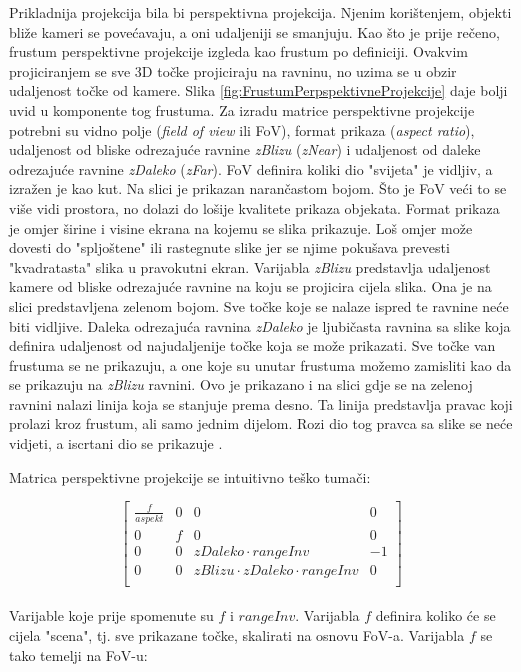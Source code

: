 \documentclass{foi}
\begin{document}
Prikladnija projekcija bila bi perspektivna projekcija. Njenim korištenjem, objekti bliže kameri se povećavaju, a oni udaljeniji se smanjuju. Kao što je prije rečeno, frustum perspektivne projekcije izgleda kao frustum po definiciji. Ovakvim projiciranjem se sve 3D točke projiciraju na ravninu, no uzima se u obzir udaljenost točke od kamere. Slika \ref{fig:FrustumPerpspektivneProjekcije} daje bolji uvid u komponente tog frustuma. Za izradu matrice perspektivne projekcije potrebni su vidno polje (\textit{field of view} ili FoV), format prikaza (\textit{aspect ratio}), udaljenost od bliske odrezajuće ravnine \textit{zBlizu} (\textit{zNear}) i udaljenost od daleke odrezajuće ravnine \textit{zDaleko} (\textit{zFar}). FoV definira koliki dio "svijeta" je vidljiv, a izražen je kao kut. Na slici je prikazan narančastom bojom. Što je FoV veći to se više vidi prostora, no dolazi do lošije kvalitete prikaza objekata. Format prikaza je omjer širine i visine ekrana na kojemu se slika prikazuje. Loš omjer može dovesti do "spljoštene" ili rastegnute slike jer se njime pokušava prevesti "kvadratasta" slika u pravokutni ekran. Varijabla \textit{zBlizu} predstavlja udaljenost kamere od bliske odrezajuće ravnine na koju se projicira cijela slika. Ona je na slici predstavljena zelenom bojom. Sve točke koje se nalaze ispred te ravnine neće biti vidljive. Daleka odrezajuća ravnina \textit{zDaleko} je ljubičasta ravnina sa slike koja definira udaljenost od najudaljenije točke koja se može prikazati. Sve točke van frustuma se ne prikazuju, a one koje su unutar frustuma možemo zamisliti kao da se prikazuju na \textit{zBlizu} ravnini. Ovo je prikazano i na slici gdje se na zelenoj ravnini nalazi linija koja se stanjuje prema desno. Ta linija predstavlja pravac koji prolazi kroz frustum, ali samo jednim dijelom. Rozi dio tog pravca sa slike se neće vidjeti, a iscrtani dio se prikazuje \parencite{Perspective3DBezDat}. 

Matrica perspektivne projekcije \parencite{WebGPUFundamentalsPerspective} se intuitivno teško tumači:

\[
\begin{bmatrix}
	\frac{f}{aspekt} & 0 & 0 & 0 \\
	0 & f & 0 & 0 \\
	0 & 0 & zDaleko \cdot rangeInv & -1 \\
	0 & 0 & zBlizu \cdot zDaleko \cdot rangeInv & 0 \\
\end{bmatrix}
\]
\\Varijable koje prije spomenute su $f$ i $rangeInv$. Varijabla $f$ definira koliko će se cijela "scena", tj. sve prikazane točke, skalirati na osnovu FoV-a. Varijabla $f$ se tako temelji na FoV-u:
\end{document}
